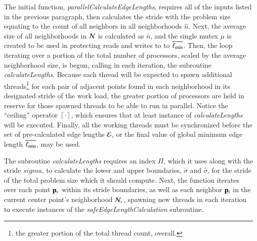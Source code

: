 
The initial function, \textit{parallelCalculateEdgeLengths}, requires all of the inputs listed in the previous paragraph, then calculates the stride with the problem size equating to the count of all neighbors in all neighborhoods $\hat{n}$. Next, the average size of all neighborhoods in $\mathcal{N}$ is calculated as $\bar{n}$, and the single mutex $\mu$ is created to be used in protecting reads and writes to to $\overline{\ell_\text{min}}$. Then, the loop iterating over a portion of the total number of processors, scaled by the average neighborhood size, is begun, calling in each iteration, the subroutine \textit{calculateLengths}. Because each thread will be expected to spawn additional threads\footnote{the greater portion of the total thread count, overall.} for each pair of adjacent points found in each neighborhood in its designated stride of the work load, the greater portion of processors are held in reserve for those spawned threads to be able to run in parallel. Notice the ``ceiling'' operator $\left\lceil\cdot\right\rceil$, which ensures that at least instance of \textit{calculateLengths} will be executed. Finally, all the working threads must be synchronized before the set of pre-calculated edge lengths $\mathcal{E}$, or the final value of global minimum edge length $\overline{\ell_\text{min}}$, may be used.

The subroutine \textit{calculateLengths} requires an index $\Pi$, which it uses along with the stride $sigma$, to calculate the lower and upper boundaries, $\check{\sigma}$ and $\hat{\sigma}$, for the stride of the total problem size which it should compute. Next, the function iterates over each point $\mathbf{p}_v$ within its stride boundaries, as well as each neighbor $\mathbf{p}_i$ in the current center point's neighborhood $\mathcal{N}_v$, spawning new threads in each iteration to execute instances of the \textit{safeEdgeLengthCalculation} subroutine.


